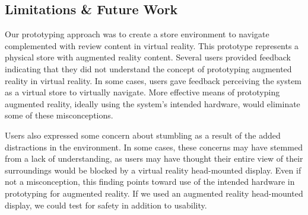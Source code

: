 \subsection{Limitations \& Future Work}
Our prototyping approach was to create a store environment to navigate complemented with review content in virtual reality.  This prototype represents a physical store with augmented reality content.  Several users provided feedback indicating that they did not understand the concept of prototyping augmented reality in virtual reality.  In some cases, users gave feedback perceiving the system as a virtual store to virtually navigate.  More effective means of prototyping augmented reality, ideally using the system's intended hardware, would eliminate some of these misconceptions.

Users also expressed some concern about stumbling as a result of the added distractions in the environment.  In some cases, these concerns may have stemmed from a lack of understanding, as users may have thought their entire view of their surroundings would be blocked by a virtual reality head-mounted display.  Even if not a misconception, this finding points toward use of the intended hardware in prototyping for augmented reality.  If we used an augmented reality head-mounted display, we could test for safety in addition to usability.
